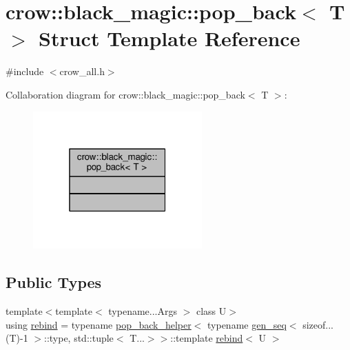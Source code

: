 \hypertarget{structcrow_1_1black__magic_1_1pop__back}{\section{crow\-:\-:black\-\_\-magic\-:\-:pop\-\_\-back$<$ T $>$ Struct Template Reference}
\label{structcrow_1_1black__magic_1_1pop__back}
}


{\ttfamily \#include $<$crow\-\_\-all.\-h$>$}



Collaboration diagram for crow\-:\-:black\-\_\-magic\-:\-:pop\-\_\-back$<$ T $>$\-:
\nopagebreak
\begin{figure}[H]
\begin{center}
\leavevmode
\includegraphics[width=184pt]{structcrow_1_1black__magic_1_1pop__back__coll__graph}
\end{center}
\end{figure}
\subsection*{Public Types}
\begin{DoxyCompactItemize}
\item 
{\footnotesize template$<$template$<$ typename...\-Args $>$ class U$>$ }\\using \hyperlink{structcrow_1_1black__magic_1_1pop__back_a4c6a6f10af4f26498a17007b211cdaef}{rebind} = typename \hyperlink{structcrow_1_1black__magic_1_1pop__back__helper}{pop\-\_\-back\-\_\-helper}$<$ typename \hyperlink{structcrow_1_1black__magic_1_1gen__seq}{gen\-\_\-seq}$<$ sizeof...(T)-\/1 $>$\-::type, std\-::tuple$<$ T...$>$$>$\-::template \hyperlink{structcrow_1_1black__magic_1_1pop__back_a4c6a6f10af4f26498a17007b211cdaef}{rebind}$<$ U $>$
\end{DoxyCompactItemize}


